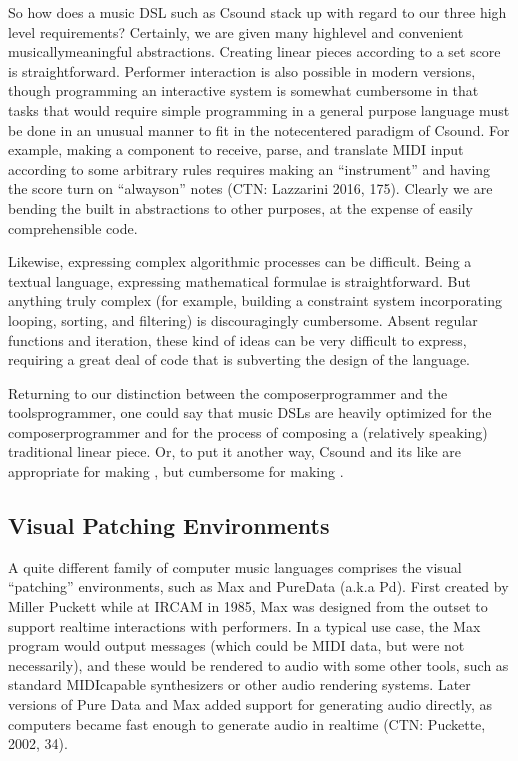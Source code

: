 \documentclass[letterpaper,10pt,english]{sphinxmanual}
\begin{document}
\sphinxAtStartPar
So how does a music DSL such as Csound stack up with regard to our three high level requirements?
Certainly, we are given many high\sphinxhyphen{}level and convenient musically\sphinxhyphen{}meaningful abstractions.
Creating linear pieces according to a set score is straightforward.
Performer interaction is also possible in modern versions, though programming
an interactive system is somewhat cumbersome in that tasks that would require simple programming
in a general purpose language must be done in an unusual manner to fit in the note\sphinxhyphen{}centered paradigm of Csound.
For example,  making a component to receive, parse, and translate MIDI input according
to some arbitrary rules requires making an “instrument” and having the
score turn on “always\sphinxhyphen{}on” notes (CTN: Lazzarini 2016, 175).
Clearly we are bending the built in abstractions to other purposes,
at the expense of easily comprehensible code.

\sphinxAtStartPar
Likewise, expressing complex algorithmic processes can be difficult.
Being a textual language, expressing mathematical formulae is straightforward.
But anything truly complex (for example, building a constraint system incorporating
looping, sorting, and filtering) is discouragingly cumbersome.
Absent regular functions and iteration, these kind of ideas can be very difficult to express,
requiring a great deal of code that is subverting the design of the language.

\sphinxAtStartPar
Returning to our distinction between the composer\sphinxhyphen{}programmer and the tools\sphinxhyphen{}programmer,
one could say that music DSLs are heavily optimized for the composer\sphinxhyphen{}programmer
and for the process of composing a (relatively speaking) traditional linear piece.
Or, to put it another way, Csound and its like are appropriate for making ,
but cumbersome for making .


\subsection{Visual Patching Environments}
\label{\detokenize{background:visual-patching-environments}}
\sphinxAtStartPar
A quite different family of computer music languages comprises the visual “patching” environments,
such as Max and PureData (a.k.a Pd).
First created by Miller Puckett while at IRCAM in 1985,
Max was designed from the outset to support realtime interactions with performers.
In a typical use case, the Max program would output messages (which could be MIDI data, but were not
necessarily), and these would be rendered to audio with some other tools, such
as standard MIDI\sphinxhyphen{}capable synthesizers or other audio rendering systems.
Later versions of Pure Data and Max added support for generating audio directly,
as computers became fast enough to generate audio in real\sphinxhyphen{}time (CTN: Puckette, 2002, 34).
\end{document}
